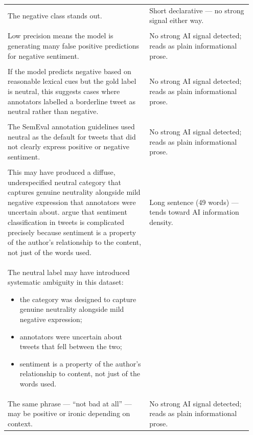 \documentclass[11pt]{article}
\begin{document}
\begin{longtable}{|p{0.55\linewidth}|p{0.40\linewidth}|}
\hline
\rule{0pt}{3.5cm} & \\
\hline
The negative class stands out. & Short declarative --- no strong signal either way. \\[2pt]
\hline
\rule{0pt}{3.5cm} & \\
\hline
Low precision means the model is generating many false positive predictions for negative sentiment. & No strong AI signal detected; reads as plain informational prose. \\[2pt]
\hline
\rule{0pt}{3.5cm} & \\
\hline
If the model predicts negative based on reasonable lexical cues but the gold label is neutral, this suggests cases where annotators labelled a borderline tweet as neutral rather than negative. & No strong AI signal detected; reads as plain informational prose. \\[2pt]
\hline
\rule{0pt}{3.5cm} & \\
\hline
The SemEval annotation guidelines used neutral as the default for tweets that did not clearly express positive or negative sentiment. & No strong AI signal detected; reads as plain informational prose. \\[2pt]
\hline
\rule{0pt}{3.5cm} & \\
\hline
This may have produced a diffuse, underspecified neutral category that captures genuine neutrality alongside mild negative expression that annotators were uncertain about. argue that sentiment classification in tweets is complicated precisely because sentiment is a property of the author's relationship to the content, not just of the words used. & Long sentence (49 words) --- tends toward AI information density. \\[2pt]
\hline
The neutral label may have introduced systematic ambiguity in this dataset:
\begin{itemize}[leftmargin=*,topsep=2pt,itemsep=1pt,parsep=0pt]
  \item the category was designed to capture genuine neutrality alongside mild negative expression;
  \item annotators were uncertain about tweets that fell between the two;
  \item sentiment is a property of the author's relationship to content, not just of the words used.
\end{itemize} & \\
\hline
The same phrase --- ``not bad at all'' --- may be positive or ironic depending on context. & No strong AI signal detected; reads as plain informational prose. \\[2pt]

\end{longtable}
\end{document}
